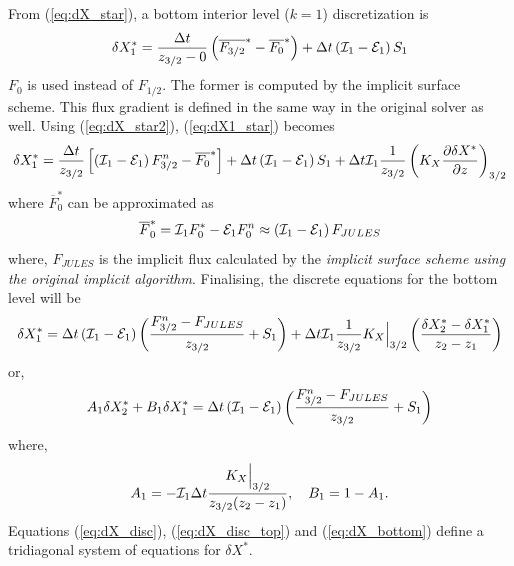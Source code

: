 \documentclass{UMDP_article}
\begin{document}
From (\ref{eq:dX_star}), a bottom interior level ($k=1$)
discretization is
\begin{equation}
  \delta X_{1}^{*}=\frac{\Delta t}{z_{3/2}-0}\left(\overline{F_{3/2}}^{*}-\overline{F_{0}}^{*}\right)+\Delta t\left({\cal I}_{1}-{\cal E}_{1}\right)S_{1}\label{eq:dX1_star}
\end{equation}
$F_{0}$ is used instead of $F_{1/2}$. The former is computed by the
implicit surface scheme. This flux gradient is defined in the same way
in the original solver as well. Using (\ref{eq:dX_star2}),
(\ref{eq:dX1_star}) becomes
\begin{equation} 
  \delta
  X_{1}^{*}=\frac{\Delta t}{z_{3/2}}
  \left[\left({\cal I}_{1}-{\cal E}_{1}\right)F_{3/2}^{n}-\overline{F_{0}}^{*}\right]
  +\Delta t\left({\cal I}_{1}-{\cal E}_{1}\right)
  S_{1}+\Delta t{\cal I}_{1}\frac{1}{z_{3/2}}
  \left(K_{X}\frac{\partial\delta X^{*}}{\partial z}\right)_{3/2}
  \label{eq:dX1_star2}
\end{equation} 
where $\overline{F}_{0}^{*}$ can be approximated as
\begin{equation}
  \overline{F}_{0}^{*}={\cal I}_{1}F_{0}^{*}-{\cal E}_{1}F_{0}^{n}\approx\left({\cal I}_{1}-{\cal E}_{1}\right)F_{JULES}\label{eq:F0_star}
\end{equation}
where, $F_{JULES}$ is the implicit flux calculated by the
\textit{implicit surface scheme using the original implicit
  algorithm}. Finalising, the discrete equations for the bottom level
will be
\begin{equation*}
  \delta X_{1}^{*}=\Delta t\left({\cal I}_{1}-{\cal E}_{1}\right)
  \left(\frac{F_{3/2}^{n}-F_{JULES}}{z_{3/2}}+S_{1}\right)
  +\Delta t{\cal I}_{1}\frac{1}{z_{3/2}}K_{X}\Big|_{3/2}
  \left(\frac{\delta X_{2}^{*}-\delta X_{1}^{*}}{z_{2}-z_{1}}\right)
\end{equation*}
or,
\begin{equation} 
  A_{1}\delta X_{2}^{*}+B_{1}\delta X_{1}^{*}=\Delta t
  \left({\cal I}_{1}-{\cal E}_{1}\right)\left(\frac{F_{3/2}^{n}-F_{JULES}}{z_{3/2}}+S_{1}\right)\label{eq:dX_bottom}
\end{equation}
where,
\begin{equation*}
  A_{1}=-{\cal I}_{1}\Delta t\frac{K_{X}\Big|_{3/2}}{z_{3/2}(z_{2}-z_{1})},
  \quad B_{1}=1-A_{1}.
\end{equation*}
Equations (\ref{eq:dX_disc}), (\ref{eq:dX_disc_top}) and
(\ref{eq:dX_bottom}) define a tridiagonal system of equations for
$\delta X^{*}$.
\end{document}
